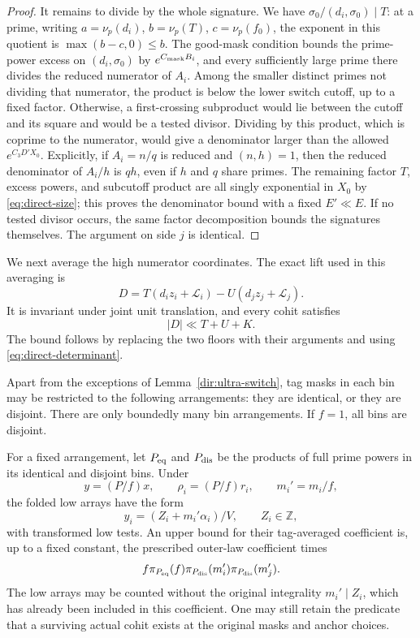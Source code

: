 \begin{proof}
It remains to divide by the whole signature. We have
$\sigma_0/(d_i,\sigma_0)\mid T$: at a prime, writing
$a=\nu_p(d_i)$, $b=\nu_p(T)$, $c=\nu_p(f_0)$, the exponent in this
quotient is $\max(b-c,0)\le b$. The good-mask condition bounds the
prime-power excess on $(d_i,\sigma_0)$ by $e^{C_{\rm mask}B_i}$, and every
sufficiently large prime there divides the reduced numerator of $A_i$.
Among the smaller distinct primes not dividing that numerator, the product
is below the lower switch cutoff, up to a fixed factor. Otherwise, a
first-crossing subproduct would lie between the cutoff and its square and
would be a tested divisor. Dividing by this product, which is coprime to
the numerator, would give a denominator larger than the allowed
$e^{C_3D'X_0}$. Explicitly, if $A_i=n/q$ is reduced and $(n,h)=1$,
then the reduced denominator of $A_i/h$ is $qh$, even if $h$ and $q$
share primes. The remaining factor $T$, excess powers, and subcutoff
product are all singly exponential in $X_0$ by
\eqref{eq:direct-size}; this proves the denominator bound with a fixed
$E'\ll E$. If no tested divisor occurs, the same factor decomposition
bounds the signatures themselves. The argument on side $j$ is identical.
\end{proof}

We next average the high numerator coordinates. The exact lift used in
this averaging is
\[
 D=T(d_i z_i+\mathcal L_i)-U(d_j z_j+\mathcal L_j).
\]
It is invariant under joint unit translation, and every cohit satisfies
\[
 |D|\ll T+U+K.
\]
The bound follows by replacing the two floors with their arguments and
using \eqref{eq:direct-determinant}.

\begin{lemma}\label{dir:tag-fold}
Apart from the exceptions of Lemma~\ref{dir:ultra-switch}, tag masks in
each bin may be restricted to the following arrangements: they are
identical, or they are disjoint. There are only boundedly many bin
arrangements. If $f=1$, all bins are disjoint.

For a fixed arrangement, let $P_{\rm eq}$ and $P_{\rm dis}$ be the products
of full prime powers in its identical and disjoint bins. Under
\[
 y=(P/f)x,\qquad \rho_i=(P/f)r_i,\qquad m_i'=m_i/f,
\]
the folded low arrays have the form
\[
 y_i=(Z_i+m_i'\alpha_i)/V,
 \qquad Z_i\in\mathbb Z,
\]
with transformed low tests. An upper bound for their tag-averaged
coefficient is, up to a fixed constant, the prescribed outer-law
coefficient times
\[
 f\pi_{P_{\rm eq}}(f)
       \pi_{P_{\rm dis}}(m_i')\pi_{P_{\rm dis}}(m_j').
\]
The low arrays may be counted without the original integrality
$m_i'\mid Z_i$, which has already been included in this coefficient.
One may still retain the predicate that a surviving actual cohit exists
at the original masks and anchor choices.
\end{lemma}


